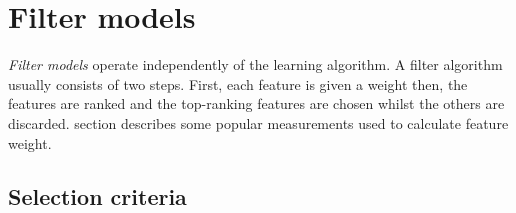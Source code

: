 \section{Filter models}\label{sec:fs_filter}
\textit{Filter models} operate independently of the learning algorithm. A filter algorithm usually consists of two steps. First, each feature is given a weight then, the features are ranked and the top-ranking features are chosen whilst the others are discarded.  section describes some popular measurements used to calculate feature weight.

\subsection{Selection criteria}\label{sec:fs_criteria}
